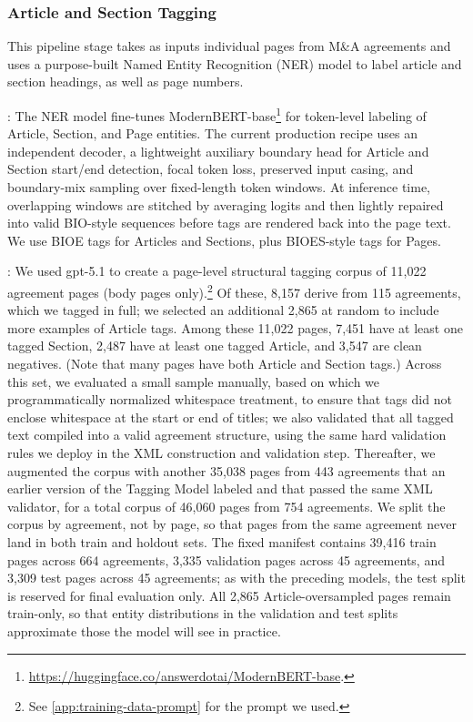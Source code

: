 \documentclass[12pt]{article}
\begin{document}
\subsubsection{Article and Section Tagging}\label{sec:article-section-tagging}
This pipeline stage takes as inputs individual pages from M\&A agreements and uses a purpose-built Named Entity Recognition (NER) model to label article and section headings, as well as page numbers.

\underline{}: The NER model fine-tunes ModernBERT-base\footnote{\url{https://huggingface.co/answerdotai/ModernBERT-base}.} for token-level labeling of Article, Section, and Page entities. The current production recipe uses an independent decoder, a lightweight auxiliary boundary head for Article and Section start/end detection, focal token loss, preserved input casing, and boundary-mix sampling over fixed-length token windows. At inference time, overlapping windows are stitched by averaging logits and then lightly repaired into valid BIO-style sequences before tags are rendered back into the page text. We use BIOE tags for Articles and Sections, plus BIOES-style tags for Pages.

\underline{}: We used gpt-5.1 to create a page-level structural tagging corpus of 11,022 agreement pages (body pages only).\footnote{See \autoref{app:training-data-prompt} for the prompt we used.} Of these, 8,157 derive from 115 agreements, which we tagged in full; we selected an additional 2,865 at random to include more examples of Article tags. Among these 11,022 pages, 7,451 have at least one tagged Section, 2,487 have at least one tagged Article, and 3,547 are clean negatives. (Note that many pages have both Article and Section tags.) Across this set, we evaluated a small sample manually, based on which we programmatically normalized whitespace treatment, to ensure that tags did not enclose whitespace at the start or end of titles; we also validated that all tagged text compiled into a valid agreement structure, using the same hard validation rules we deploy in the XML construction and validation step. Thereafter, we augmented the corpus with another 35,038 pages from 443 agreements that an earlier version of the Tagging Model labeled and that passed the same XML validator, for a total corpus of 46,060 pages from 754 agreements. We split the corpus by agreement, not by page, so that pages from the same agreement never land in both train and holdout sets. The fixed manifest contains 39,416 train pages across 664 agreements, 3,335 validation pages across 45 agreements, and 3,309 test pages across 45 agreements; as with the preceding models, the test split is reserved for final evaluation only. All 2,865 Article-oversampled pages remain train-only, so that entity distributions in the validation and test splits approximate those the model will see in practice.
\end{document}
